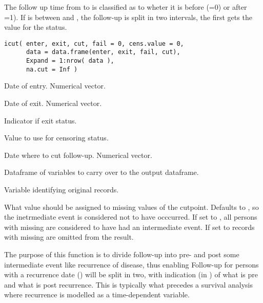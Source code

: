 \begin{Description}\relax
The follow up time from  to  is classified as
to wheter it is before  (=0) or after
=1). If  is between  and ,
the follow-up is split in two intervals, the first gets the value
 for the status.
\end{Description}
\begin{Usage}
\begin{verbatim}
icut( enter, exit, cut, fail = 0, cens.value = 0,
      data = data.frame(enter, exit, fail, cut),
      Expand = 1:nrow( data ),
      na.cut = Inf )
\end{verbatim}
\end{Usage}
\begin{Arguments}
\begin{ldescription}
\item[\code{enter}] Date of entry. Numerical vector.
\item[\code{exit}] Date of exit. Numerical vector.
\item[\code{fail}] Indicator if exit status.
\item[\code{cens.value}] Value to use for censoring status.
\item[\code{cut}] Date where to cut follow-up. Numerical vector.
\item[\code{data}] Dataframe of variables to carry over to the output dataframe.
\item[\code{Expand}] Variable identifying original records.
\item[\code{na.cut}] What value should be assigned to missing values of the
cutpoint. Defaults to , so the inetrmediate event is
considered not to have occcurred. If set to , all persons
with missing  are considered to have had an intermediate
event. If set to  records with missing  are
omitted from the result.
\end{ldescription}
\end{Arguments}
\begin{Details}\relax
The purpose of this function is to divide follow-up into pre- and post
some intermediate event like recurrence of disease, thus enabling
Follow-up for persons with a recurrence date () will be
split in two, with indication (in ) of what is pre and what
is post recurrence. This is typically what precedes a survival
analysis where recurrence is modelled as a time-dependent variable.
\end{Details}
